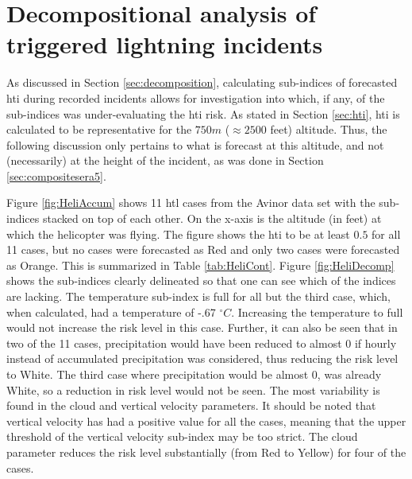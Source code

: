 \section{Decompositional analysis of triggered lightning incidents}
As discussed in Section \ref{sec:decomposition}, calculating sub-indices of forecasted \acrshort{hti} during recorded incidents allows for investigation into which, if any, of the sub-indices was under-evaluating the \acrshort{hti} risk. As stated in Section \ref{sec:hti}, \acrshort{hti} is calculated to be representative for the $750m$ ($\approx 2500$ feet) altitude. Thus, the following discussion only pertains to what is forecast at this altitude, and not (necessarily) at the height of the incident, as was done in Section \ref{sec:compositesera5}.

Figure \ref{fig:HeliAccum} shows 11 \acrshort{htl} cases from the Avinor data set with the sub-indices stacked on top of each other. On the x-axis is the altitude (in feet) at which the helicopter was flying. The figure shows the \acrshort{hti} to be at least $0.5$ for all 11 cases, but no cases were forecasted as Red and only two cases were forecasted as Orange. This is summarized in Table \ref{tab:HeliCont}. Figure \ref{fig:HeliDecomp} shows the sub-indices clearly delineated so that one can see which of the indices are lacking. The temperature sub-index is full for all but the third case, which, when calculated, had a temperature of -.67 $^{\circ}C$. Increasing the temperature to full would not increase the risk level in this case. Further, it can also be seen that in two of the 11 cases, precipitation would have been reduced to almost 0 if hourly instead of accumulated precipitation was considered, thus reducing the risk level to White. The third case where precipitation would be almost 0, was already White, so a reduction in risk level would not be seen. The most variability is found in the cloud and vertical velocity parameters. It should be noted that vertical velocity has had a positive value for all the cases, meaning that the upper threshold of the vertical velocity sub-index may be too strict. The cloud parameter reduces the risk level substantially (from Red to Yellow) for four of the cases. 

